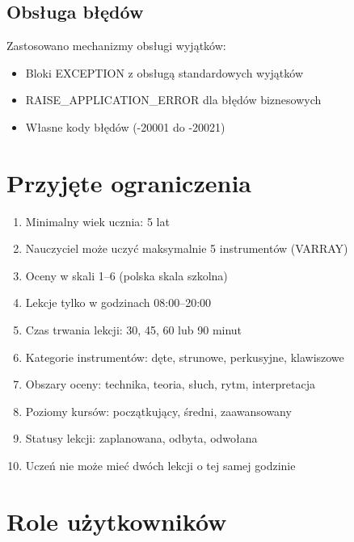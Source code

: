 \documentclass[12pt,a4paper]{article}
\begin{document}
\subsection{Obsługa błędów}
Zastosowano mechanizmy obsługi wyjątków:
\begin{itemize}[nosep]
    \item Bloki EXCEPTION z obsługą standardowych wyjątków
    \item RAISE\_APPLICATION\_ERROR dla błędów biznesowych
    \item Własne kody błędów (-20001 do -20021)
\end{itemize}

\section{Przyjęte ograniczenia}

\begin{enumerate}[nosep]
    \item Minimalny wiek ucznia: 5 lat
    \item Nauczyciel może uczyć maksymalnie 5 instrumentów (VARRAY)
    \item Oceny w skali 1--6 (polska skala szkolna)
    \item Lekcje tylko w godzinach 08:00--20:00
    \item Czas trwania lekcji: 30, 45, 60 lub 90 minut
    \item Kategorie instrumentów: dęte, strunowe, perkusyjne, klawiszowe
    \item Obszary oceny: technika, teoria, słuch, rytm, interpretacja
    \item Poziomy kursów: początkujący, średni, zaawansowany
    \item Statusy lekcji: zaplanowana, odbyta, odwołana
    \item Uczeń nie może mieć dwóch lekcji o tej samej godzinie
\end{enumerate}

\section{Role użytkowników}
\end{document}

